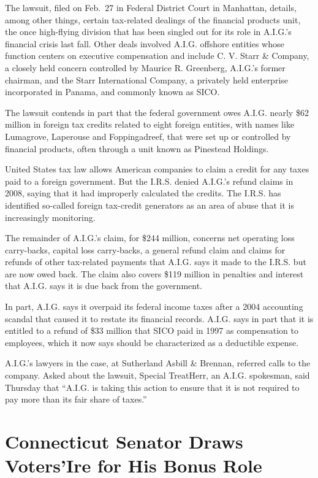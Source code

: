 \documentclass[12pt,a4paper,onecolumn]{article}
\begin{document}
\begin{CJK*}{GBK}{song}
The lawsuit, filed on Feb.~27 in Federal District Court in Manhattan, details, among other things,
certain tax-related dealings of the financial products unit, the once high-flying division that has
been singled out for its role in A.I.G.'s financial crisis last fall. Other deals involved A.I.G.
offshore entities whose function centers on executive compensation and include C. V. Starr \&
Company, a closely held concern controlled by Maurice R. Greenberg, A.I.G.'s former chairman, and
the Starr International Company, a privately held enterprise incorporated in Panama, and commonly
known as SICO.

The lawsuit contends in part that the federal government owes A.I.G. nearly \$62 million in foreign
tax credits related to eight foreign entities, with names like Lumagrove, Laperouse and
Foppingadreef, that were set up or controlled by financial products, often through a unit known as
Pinestead Holdings.

United States tax law allows American companies to claim a credit for any taxes paid to a foreign
government. But the I.R.S. denied A.I.G.'s refund claims in 2008, saying that it had improperly
calculated the credits. The I.R.S. has identified so-called foreign tax-credit generators as an area
of abuse that it is increasingly monitoring.

The remainder of A.I.G.'s claim, for \$244 million, concerns net operating loss carry-backs, capital
loss carry-backs, a general refund claim and claims for refunds of other tax-related payments that
A.I.G. says it made to the I.R.S. but are now owed back. The claim also covers \$119 million in
penalties and interest that A.I.G. says it is due back from the government.

In part, A.I.G. says it overpaid its federal income taxes after a 2004 accounting scandal that
caused it to restate its financial records. A.I.G. says in part that it is entitled to a refund of
\$33 million that SICO paid in 1997 as compensation to employees, which it now says should be
characterized as a deductible expense.

A.I.G.'s lawyers in the case, at Sutherland Asbill \& Brennan, referred calls to the company. Asked
about the lawsuit, Special TreatHerr, an A.I.G. spokesman, said Thursday that ``A.I.G. is taking
this action to ensure that it is not required to pay more than its fair share of taxes.''

\section{Connecticut Senator Draws Voters'Ire for His Bonus Role}


\end{CJK*}
\end{document}
